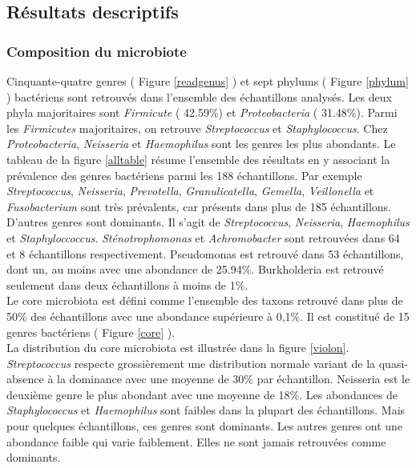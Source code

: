 \documentclass[12pt,a4paper]{article}
\begin{document}
\subsection{Résultats descriptifs}
\subsubsection{Composition du microbiote}
Cinquante-quatre genres ( Figure \ref{readgenus} ) et sept phylums ( Figure \ref{phylum} ) bactériens sont retrouvés dans l'ensemble des échantillons analysés. 
Les deux phyla majoritaires sont \textit{Firmicute} ( 42.59\%) et \textit{Proteobacteria} ( 31.48\%). Parmi les \textit{Firmicutes} majoritaires, on retrouve \textit{Streptococcus} et \textit{Staphylococcus}. Chez \textit{Proteobacteria}, \textit{Neisseria} et \textit{Haemophilus} sont les genres les plus abondants.
Le tableau de la figure \ref{alltable} résume l'ensemble des résultats en y associant la prévalence des genres bactériens parmi les 188 échantillons.
Par exemple \textit{Streptococcus}, \textit{Neisseria}, \textit{Prevotella}, \textit{Granulicatella}, \textit{Gemella}, \textit{Veillonella} et \textit{Fusobacterium} sont très prévalents, car présents dans plus de 185 échantillons.
D’autres genres sont dominants. Il s’agit de \textit{Streptococcus}, \textit{Neisseria}, \textit{Haemophilus} et \textit{Staphyloccoccus}. \textit{Sténotrophomonas} et \textit{Achromobacter} sont retrouvées dans 64 et 8 échantillons respectivement. Pseudomonas est retrouvé dans 53 échantillons, dont un, au moins avec une abondance de 25.94\%. Burkholderia est retrouvé seulement dans deux échantillons à moins de 1\%.\\
Le core microbiota\cite{VanderGast2011} est défini comme l'ensemble des taxons retrouvé dans plus de 50\% des échantillons avec une abondance supérieure à 0,1\%. Il est constitué de 15 genres bactériens ( Figure \ref{core} ).\\
La distribution du core microbiota est illustrée dans la figure \ref{violon}.
\textit{Streptococcus} respecte grossièrement une distribution normale variant de la quasi-absence à la dominance avec une moyenne de 30\% par échantillon. Neisseria est le deuxième genre le plus abondant avec une moyenne de 18\%.
Les abondances de \textit{Staphylococcus} et \textit{Haemophilus} sont faibles dans la plupart des échantillons. Mais pour quelques échantillons, ces genres sont dominants. Les autres genres ont une abondance faible qui varie faiblement. Elles ne sont jamais retrouvées comme dominants.
\end{document}
